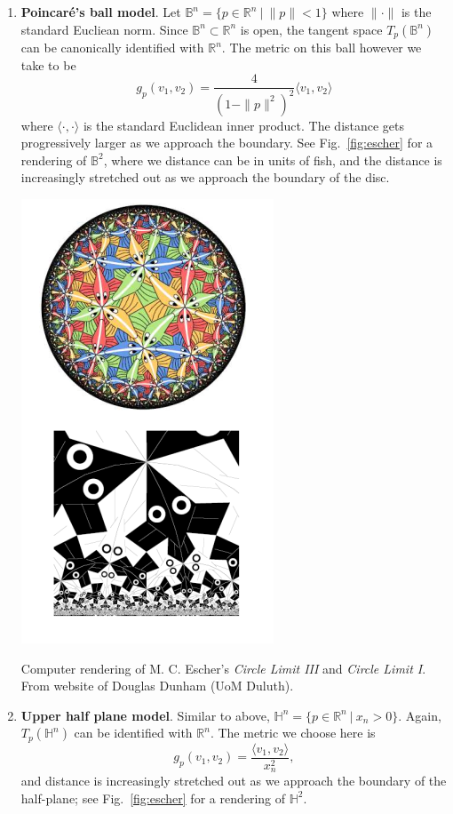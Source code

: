 \documentclass[letter-paper]{tufte-book}
\newenvironment{example}[1][Example]{\begin{trivlist}
\item[\hskip \labelsep {\bfseries #1}]}{\end{trivlist}}
\begin{document}
\begin{example}
\begin{enumerate}
    \item \textbf{Poincar\'e's ball model}. Let $\mathbb{B}^n = \{p \in \mathbb{R}^n\ |\ \|p\|<1\}$ where $\|\cdot\|$ is the standard Eucliean norm. Since $\mathbb{B}^n \subset \mathbb{R}^n$ is open, the tangent space $T_p(\mathbb{B}^n)$ can be canonically identified with $\mathbb{R}^n$. The metric on this ball however we take to be
    \begin{equation*}
      g_p (v_1, v_2) = \frac{4}{(1-\|p\|^2)^2} \langle v_1, v_2 \rangle
    \end{equation*}
    where $\langle \cdot, \cdot\rangle$ is the standard Euclidean inner product. The distance gets progressively larger as we approach the boundary. See Fig.~\ref{fig:escher} for a rendering of $\mathbb{B}^2$, where we distance can be in units of fish, and the distance is increasingly stretched out as we approach the boundary of the disc.
    \begin{marginfigure}
      \includegraphics{escher}
      \caption{Computer rendering of M. C. Escher's \emph{Circle Limit III} and \emph{Circle Limit I}. From website of Douglas Dunham (UoM Duluth).}
      \label{fig:escher}
    \end{marginfigure}
    
    \item \textbf{Upper half plane model}. Similar to above, $\mathbb{H}^n = \{p \in \mathbb{R}^n\ |\ x_n > 0\}$. Again, $T_p(\mathbb{H}^n)$ can be identified with $\mathbb{R}^n$. The metric we choose here is
    \begin{equation*}
      g_p(v_1, v_2) = \frac{\langle v_1, v_2\rangle}{x_n^2},
    \end{equation*}
    and distance is increasingly stretched out as we approach the boundary of the half-plane; see Fig.~\ref{fig:escher} for a rendering of $\mathbb{H}^2$.
  \end{enumerate}
\end{example}
\end{document}
